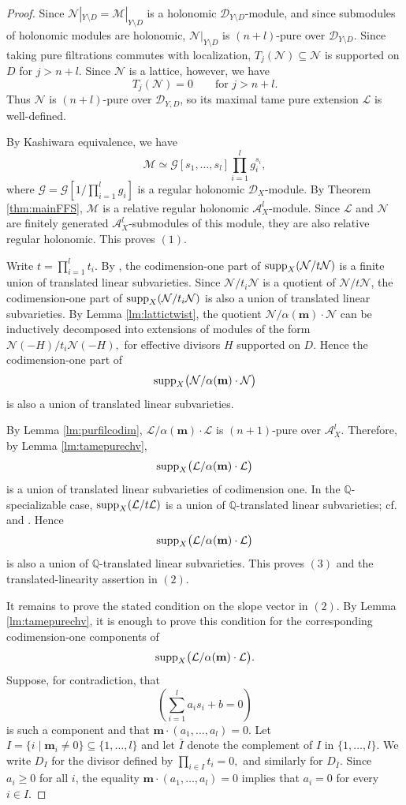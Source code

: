 \documentclass{amsart}
\theoremstyle{plain}
\numberwithin{theorem}{section}
\theoremstyle{definition}
\theoremstyle{remark}
\theoremstyle{definition}
\newcommand{\Q}{\mathbb{Q}}
\newcommand{\cG}{\mathcal{G}}
\newcommand{\cL}{\mathcal{L}}
\newcommand{\cM}{\mathcal{M}}
\newcommand{\cN}{\mathcal{N}}
\newcommand{\bm}{\mathbf{m}}
\newcommand{\sA}{\mathscr{A}}
\newcommand{\shD}{\mathscr{D}}
\newcommand{\supp}{\textup{supp}}
\begin{document}
\begin{proof}
Since
$\cN|_{Y\setminus D}=\cM|_{Y\setminus D}$
is a holonomic $\shD_{Y\setminus D}$-module, and since submodules of holonomic
modules are holonomic, $\cN|_{Y\setminus D}$ is $(n+l)$-pure over $\shD_{Y\setminus D}$.
Since taking pure filtrations commutes with localization, $T_j(\cN)\subseteq
\cN$ is supported on $D$ for $j>n+l$. Since $\cN$ is a lattice, however, we have
\[
T_j(\cN)=0
\qquad
\text{for } j>n+l.
\]
Thus $\cN$ is $(n+l)$-pure over $\shD_{Y,D}$, so its maximal tame pure extension
$\cL$ is well-defined.

By Kashiwara equivalence, we have
\[
\cM
\simeq
\cG[s_1,\dots,s_l]\prod_{i=1}^l g_i^{s_i},
\]
where
$\cG=\cG\left[1/\prod_{i=1}^l g_i\right]$
is a regular holonomic $\shD_X$-module. By Theorem \ref{thm:mainFFS},
$\cM$
is a relative regular holonomic $\sA_X^l$-module. Since $\cL$ and $\cN$ are
finitely generated $\sA_X^l$-submodules of this module, they are also relative
regular holonomic. This proves $(1)$.

Write
$t=\prod_{i=1}^l t_i.$
By \cite[Thm.3.1 and Cor.3.15]{WuRHA}, the codimension-one part of
$\supp_X(\cN/t\cN)$
is a finite union of translated linear subvarieties. Since $\cN/t_i\cN$ is a
quotient of $\cN/t\cN$, the codimension-one part of
$\supp_X(\cN/t_i\cN)$
is also a union of translated linear subvarieties. By Lemma
\ref{lm:lattictwist}, the quotient
$\cN/\alpha(\bm)\cdot\cN$
can be inductively decomposed into extensions of modules of the form
$\cN(-H)/t_i\cN(-H),$
for effective divisors $H$ supported on $D$. Hence the codimension-one part of
\[
\supp_X\big(\cN/\alpha(\bm)\cdot\cN\big)
\]
is also a union of translated linear subvarieties.

By Lemma \ref{lm:purfilcodim},
$\cL/\alpha(\bm)\cdot\cL$
is $(n+1)$-pure over $\sA_X^l$. Therefore, by Lemma \ref{lm:tamepurechv},
\[
\supp_X\big(\cL/\alpha(\bm)\cdot\cL\big)
\]
is a union of translated linear subvarieties of codimension one. In the
$\Q$-specializable case,
$\supp_X(\cL/t\cL)$
is a union of $\Q$-translated linear subvarieties; cf. \cite{Sab} and
\cite[\S 4.9]{Wuch}. Hence
\[
\supp_X\big(\cL/\alpha(\bm)\cdot\cL\big)
\]
is also a union of $\Q$-translated linear subvarieties. This proves $(3)$ and
the translated-linearity assertion in $(2)$.

It remains to prove the stated condition on the slope vector in $(2)$. By
Lemma \ref{lm:tamepurechv}, it is enough to prove this condition for the
corresponding codimension-one components of
\[
\supp_X\big(\cL/\alpha(\bm)\cdot\cL\big).
\]
Suppose, for contradiction, that
\[
\left(\sum_{i=1}^l a_i s_i+b=0\right)
\]
is such a component and that
$\bm\cdot(a_1,\dots,a_l)=0.$
Let
$I=\{i\mid \bm_i\neq 0\}\subseteq \{1,\dots,l\}$ and
let $\bar I$ denote the complement of $I$ in $\{1,\dots,l\}$. We write $D_I$
for the divisor defined by
$\prod_{i\in I}t_i=0,$
and similarly for $D_{\bar I}$. Since $a_i\ge 0$ for all $i$, the equality
$\bm\cdot(a_1,\dots,a_l)=0$
implies that
$a_i=0$ for every  $i\in I$.


\end{proof}
\end{document}
